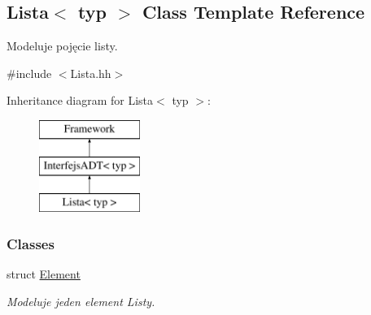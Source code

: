 \hypertarget{class_lista}{\subsection{Lista$<$ typ $>$ Class Template Reference}
\label{class_lista}
}


Modeluje pojęcie listy.  




{\ttfamily \#include $<$Lista.\-hh$>$}

Inheritance diagram for Lista$<$ typ $>$\-:\begin{figure}[H]
\begin{center}
\leavevmode
\includegraphics[height=3.000000cm]{class_lista}
\end{center}
\end{figure}
\subsubsection*{Classes}
\begin{DoxyCompactItemize}
\item 
struct \hyperlink{struct_lista_1_1_element}{Element}
\begin{DoxyCompactList}\small\item\em Modeluje jeden element Listy. \end{DoxyCompactList}\end{DoxyCompactItemize}
